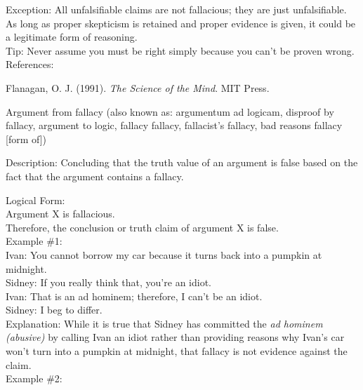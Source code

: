 \documentclass[a4paper,12pt,single,pdftex]{scrartcl}
\begin{document}
      
        Exception: All unfalsifiable claims are not fallacious; they are just unfalsifiable.  As long as proper skepticism is retained and proper evidence is given, it could be a legitimate form of reasoning.
      \\

      
        Tip: Never assume you must be right simply because you can’t be proven wrong.
      \\

      References:

      
        Flanagan, O. J. (1991). {\it The Science of the Mind}. MIT Press.
      
    
  

Argument from fallacy
    (also known as: argumentum ad logicam, disproof by fallacy, argument to logic, fallacy fallacy, fallacist's fallacy, bad reasons fallacy [form of])
  
    Description: Concluding that the truth value of an argument is false based on the fact that the argument contains a fallacy.

    
      Logical Form:
    \\

    
      Argument X is fallacious.
    \\

    
      Therefore, the conclusion or truth claim of argument X is false.
    \\

    
      Example \#1:
    \\

    
      Ivan: You cannot borrow my car because it turns back into a pumpkin at midnight.
    \\

    
      Sidney: If you really think that, you’re an idiot.
    \\

    
      Ivan: That is an ad hominem; therefore, I can’t be an idiot.
    \\

    
      Sidney: I beg to differ.
    \\

    
      Explanation: While it is true that Sidney has committed the {\it ad hominem (abusive)} by calling Ivan an idiot rather than providing reasons why Ivan’s car won’t turn into a pumpkin at midnight, that fallacy is not evidence against the claim.
    \\

    
      Example \#2:
    \\
\end{document}
